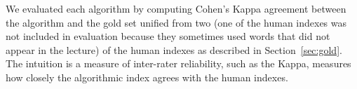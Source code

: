 
We evaluated each algorithm by computing
Cohen's Kappa agreement between the algorithm and the gold set
unified from two (one of the human indexes was not included in evaluation
because they sometimes used words that did not appear in the lecture) of the human indexes as described in
Section~\ref{sec:gold}. The intuition is a measure of inter-rater reliability,
such as the Kappa, measures how closely the algorithmic index agrees with the
human indexes.

%
%

